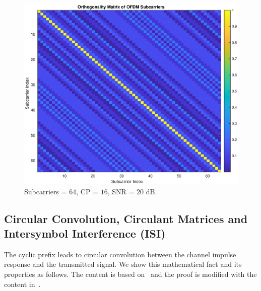 \begin{figure}[!htbp]
    \centering
    \includegraphics[width=\linewidth]{Orthogonality.eps}
    \caption{Subcarriers = $64$, CP = $16$, SNR = $20$ dB.}
    \label{fig:orthogonality}
\end{figure}

\subsection{Circular Convolution, Circulant Matrices and Intersymbol Interference (ISI)}
The cyclic prefix leads to circular convolution between the channel impulse response and the transmitted signal. We show this mathematical fact and its properties as follows. The content is based on~\cite{91291216} and the proof is modified with the content in~\cite{2024Apr}.

